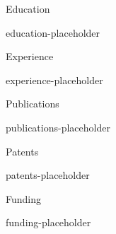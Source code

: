 


\geometry{top=1in, bottom=1in, left=1in, right=1in}

\hypersetup{colorlinks=true, allcolors=secondaryColor}



\centerline{}

\begin{cvSection}{Education}

{{education-placeholder}}

\end{cvSection}


\begin{cvSection}{Experience}

{{experience-placeholder}}

\end{cvSection}


\begin{cvSection}{Publications}

{{publications-placeholder}}

\end{cvSection}


\begin{cvSection}{Patents}

{{patents-placeholder}}

\end{cvSection}


\begin{cvSection}{Funding}

{{funding-placeholder}}

\end{cvSection}


